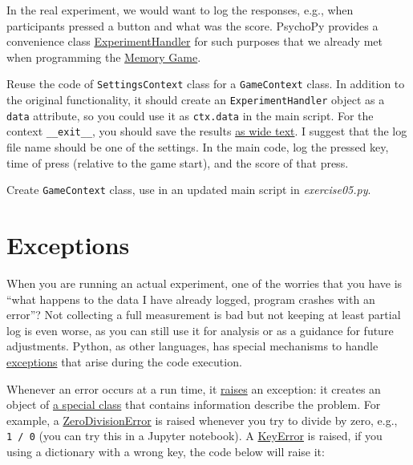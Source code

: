\documentclass[
]{book}
\begin{document}
In the real experiment, we would want to log the responses, e.g., when participants pressed a button and what was the score. PsychoPy provides a convenience class \href{https://psychopy.org/api/data.html\#experimenthandler}{ExperimentHandler} for such purposes that we already met when programming the \protect\hyperlink{logging-data}{Memory Game}.

Reuse the code of \texttt{SettingsContext} class for a \texttt{GameContext} class. In addition to the original functionality, it should create an \texttt{ExperimentHandler} object as a \texttt{data} attribute, so you could use it as \texttt{ctx.data} in the main script. For the context \texttt{\_\_exit\_\_}, you should save the results \href{https://psychopy.org/api/data.html\#psychopy.data.ExperimentHandler.saveAsWideText}{as wide text}. I suggest that the log file name should be one of the settings. In the main code, log the pressed key, time of press (relative to the game start), and the score of that press.

Create \texttt{GameContext} class, use in an updated main script in \emph{exercise05.py}.

\hypertarget{exceptions}{%
\section{Exceptions}\label{exceptions}}

When you are running an actual experiment, one of the worries that you have is ``what happens to the data I have already logged, program crashes with an error''? Not collecting a full measurement is bad but not keeping at least partial log is even worse, as you can still use it for analysis or as a guidance for future adjustments. Python, as other languages, has special mechanisms to handle \href{https://docs.python.org/3/tutorial/errors.html}{exceptions} that arise during the code execution.

Whenever an error occurs at a run time, it \href{https://docs.python.org/3/reference/simple_stmts.html\#the-raise-statement}{raises} an exception: it creates an object of \href{https://docs.python.org/3/library/exceptions.html\#concrete-exceptions}{a special class} that contains information describe the problem. For example, a \href{https://docs.python.org/3/library/exceptions.html\#ZeroDivisionError}{ZeroDivisionError} is raised whenever you try to divide by zero, e.g., \texttt{1\ /\ 0} (you can try this in a Jupyter notebook). A \href{https://docs.python.org/3/library/exceptions.html\#KeyError}{KeyError} is raised, if you using a dictionary with a wrong key, the code below will raise it:
\end{document}
